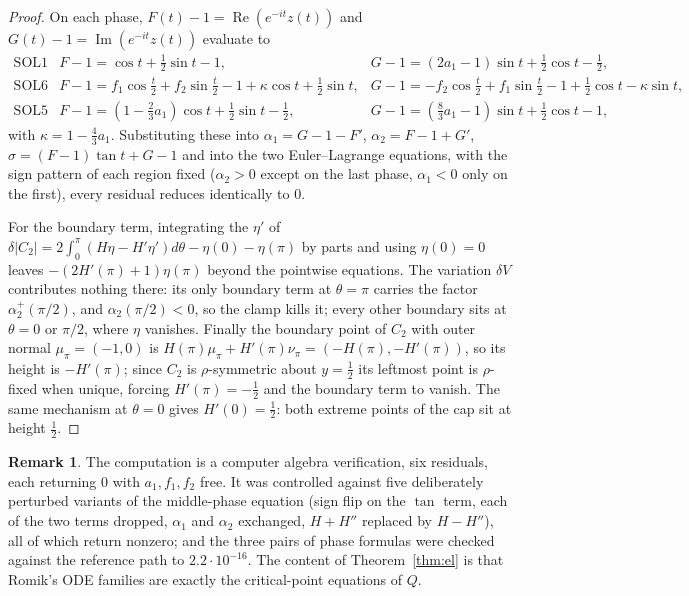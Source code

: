 \documentclass[11pt]{article}
\theoremstyle{definition}
\newtheorem{remark}[theorem]{Remark}
\begin{document}
\begin{proof}
On each phase, $F(t)-1=\operatorname{Re}(e^{-it}z(t))$ and
$G(t)-1=\operatorname{Im}(e^{-it}z(t))$ evaluate to
\[
  \begin{array}{lll}
    \text{SOL1} & F-1=\cos t+\tfrac12\sin t-1,
      & G-1=(2a_1-1)\sin t+\tfrac12\cos t-\tfrac12,\\[2pt]
    \text{SOL6} & F-1=f_1\cos\tfrac t2+f_2\sin\tfrac t2-1+\kappa\cos t+\tfrac12\sin t,
      & G-1=-f_2\cos\tfrac t2+f_1\sin\tfrac t2-1+\tfrac12\cos t-\kappa\sin t,\\[2pt]
    \text{SOL5} & F-1=(1-\tfrac23a_1)\cos t+\tfrac12\sin t-\tfrac12,
      & G-1=(\tfrac83a_1-1)\sin t+\tfrac12\cos t-1,
  \end{array}
\]
with $\kappa=1-\tfrac43a_1$. Substituting these into
$\alpha_1=G-1-F'$, $\alpha_2=F-1+G'$, $\sigma=(F-1)\tan t+G-1$ and into the two
Euler--Lagrange equations, with the sign pattern of each region fixed
($\alpha_2>0$ except on the last phase, $\alpha_1<0$ only on the first), every residual
reduces identically to $0$.

For the boundary term, integrating the $\eta'$ of
$\delta|C_2|=2\int_0^\pi(H\eta-H'\eta')d\theta-\eta(0)-\eta(\pi)$ by parts and using
$\eta(0)=0$ leaves $-(2H'(\pi)+1)\eta(\pi)$ beyond the pointwise equations. The variation
$\delta V$ contributes nothing there: its only boundary term at $\theta=\pi$ carries the
factor $\alpha_2^+(\pi/2)$, and $\alpha_2(\pi/2)<0$, so the clamp kills it; every other
boundary sits at $\theta=0$ or $\pi/2$, where $\eta$ vanishes. Finally the boundary point of
$C_2$ with outer normal $\mu_\pi=(-1,0)$ is
$H(\pi)\mu_\pi+H'(\pi)\nu_\pi=(-H(\pi),-H'(\pi))$, so its height is $-H'(\pi)$; since $C_2$
is $\rho$-symmetric about $y=\tfrac12$ its leftmost point is $\rho$-fixed when unique,
forcing $H'(\pi)=-\tfrac12$ and the boundary term to vanish. The same mechanism at
$\theta=0$ gives $H'(0)=\tfrac12$: both extreme points of the cap sit at height $\tfrac12$.
\end{proof}

\begin{remark}
The computation is a computer algebra verification, six residuals, each returning $0$
with $a_1,f_1,f_2$ free. It was controlled against five deliberately perturbed variants
of the middle-phase equation (sign flip on the $\tan$ term, each of the two terms dropped,
$\alpha_1$ and $\alpha_2$ exchanged, $H+H''$ replaced by $H-H''$), all of which return
nonzero; and the three pairs of phase formulas were checked against the reference path to
$2.2\cdot10^{-16}$. The content of Theorem~\ref{thm:el} is that Romik's ODE families are
exactly the critical-point equations of $Q$.
\end{remark}
\end{document}
